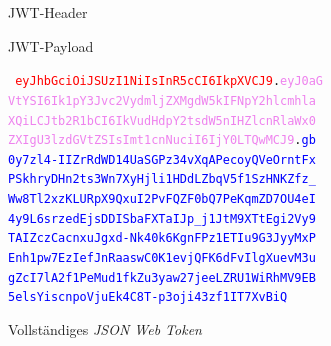 \documentclass{beamer}
\begin{document}
\begin{frame}{\insertsubsection}{}%

\begin{figure}
\caption{JWT-Header}
\end{figure}

\begin{figure}
\caption{JWT-Payload}
\end{figure}

\end{frame}

\begin{frame}{\insertsubsection}
	\begin{figure}
		{\tt \textcolor{red}{
				eyJhbGciOiJSUzI1NiIsInR5cCI6IkpXVCJ9}.\textcolor{violet}{eyJ0aG\\
				VtYSI6Ik1pY3Jvc2VydmljZXMgdW5kIFNpY2hlcmhla\\
				XQiLCJtb2R1bCI6IkVudHdpY2tsdW5nIHZlcnRlaWx0\\
				ZXIgU3lzdGVtZSIsImt1cnNuciI6IjY0LTQwMCJ9}.\textcolor{blue}{gb\\
				0y7zl4-IIZrRdWD14UaSGPz34vXqAPecoyQVeOrntFx\\
				PSkhryDHn2ts3Wn7XyHjli1HDdLZbqV5f1SzHNKZfz\_\\
				Ww8Tl2xzKLURpX9QxuI2PvFQZF0bQ7PeKqmZD7OU4eI\\
				4y9L6srzedEjsDDISbaFXTaIJp\_j1JtM9XTtEgi2Vy9\\
				TAIZczCacnxuJgxd-Nk40k6KgnFPz1ETIu9G3JyyMxP\\
				Enh1pw7EzIefJnRaaswC0K1evjQFK6dFvIlgXuevM3u\\
				gZcI7lA2f1PeMud1fkZu3yaw27jeeLZRU1WiRhMV9EB\\
				5elsYiscnpoVjuEk4C8T-p3oji43zf1IT7XvBiQ}}
		\caption{Vollständiges \textit{JSON Web Token}}
	\end{figure}
\end{frame}
\end{document}
